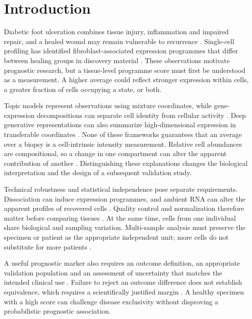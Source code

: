 \documentclass[10pt,a4paper]{article}
\begin{document}
\section{Introduction}
Diabetic foot ulceration combines tissue injury, inflammation and impaired repair, and a healed wound may remain vulnerable to recurrence \citep{armstrong2017,wilkinson2020}. Single-cell profiling has identified fibroblast-associated expression programmes that differ between healing groups in discovery material \citep{theocharidis2022,geo_gse165816}. These observations motivate prognostic research, but a tissue-level programme score must first be understood as a measurement. A higher average could reflect stronger expression within cells, a greater fraction of cells occupying a state, or both.

Topic models represent observations using mixture coordinates, while gene-expression decompositions can separate cell identity from cellular activity \citep{blei2003,kotliar2019}. Deep generative representations can also summarize high-dimensional expression in transferable coordinates \citep{lopez2018}. None of these frameworks guarantees that an average over a biopsy is a cell-intrinsic intensity measurement. Relative cell abundances are compositional, so a change in one compartment can alter the apparent contribution of another \citep{buettner2021}. Distinguishing these explanations changes the biological interpretation and the design of a subsequent validation study.

Technical robustness and statistical independence pose separate requirements. Dissociation can induce expression programmes, and ambient RNA can alter the apparent profiles of recovered cells \citep{vandenbrink2017,young2020}. Quality control and normalization therefore matter before comparing tissues \citep{heumos2023}. At the same time, cells from one individual share biological and sampling variation. Multi-sample analysis must preserve the specimen or patient as the appropriate independent unit; more cells do not substitute for more patients \citep{crowell2020,squair2021,zimmerman2021,lazic2010}.

A useful prognostic marker also requires an outcome definition, an appropriate validation population and an assessment of uncertainty that matches the intended clinical use \citep{collins2015}. Failure to reject an outcome difference does not establish equivalence, which requires a scientifically justified margin \citep{schuirmann1987,lakens2017}. A healthy specimen with a high score can challenge disease exclusivity without disproving a probabilistic prognostic association.
\end{document}
